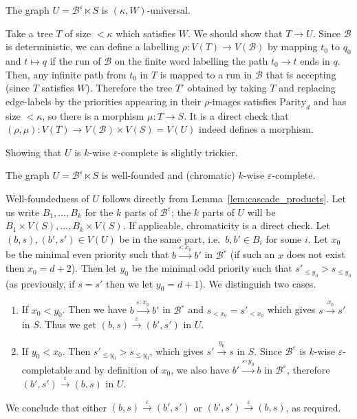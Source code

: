 \documentclass[a4paper,UKenglish,cleveref, thm-restate]{lipics-v2021}
\newcommand{\re}[1]{\xrightarrow{#1}}
\newcommand{\Parity}{\mathrm{Parity}}
\newcommand{\eps}{\varepsilon}
\newcommand{\casc}{\ltimes}
\newcommand{\B}{\mathcal B}
\begin{document}
\begin{claim}
    The graph $U = \B^\eps \casc S$ is $(\kappa,W)$-universal.
\end{claim}

\begin{claimproof}
    Take a tree $T$ of size $<\kappa$ which satisfies $W$.
    We should show that $T \to U$.
    Since $\B$ is deterministic, we can define a labelling $\rho\colon V(T) \to V(\B)$ by mapping $t_0$ to $q_0$ and $t \mapsto q$ if the run of $\B$ on the finite word labelling the path $t_0\re{}t$ ends in $q$. Then, any infinite path from $t_0$ in $T$ is mapped to a run in $\B$ that is accepting (since $T$ satisfies $W$).
    Therefore the tree $T'$ obtained by taking $T$ and replacing edge-labels by the priorities appearing in their $\rho$-images satisfies $\Parity_d$ and has size $<\kappa$, so there is a morphism $\mu:T \to S$.
    It is a direct check that $(\rho,\mu) \colon V(T) \to V(\B) \times V(S) = V(U)$ indeed defines a morphism.
\end{claimproof}

Showing that $U$ is $k$-wise $\eps$-complete is slightly trickier.

\begin{claim}
    The graph $U = \B^\eps \casc S$ is well-founded and (chromatic) $k$-wise $\eps$-complete.
\end{claim}

\begin{claimproof}
    Well-foundedness of $U$ follows directly from Lemma~\ref{lem:cascade_products}.
    Let us write $B_1,\dots,B_k$ for the $k$ parts of $\B^\eps$; the $k$ parts of $U$ will be $B_1 \times V(S),\dots, B_k \times V(S)$.
    If applicable, chromaticity is a direct check.
    Let $(b,s),(b',s') \in V(U)$ be in the same part, i.e.~$b,b' \in B_i$ for some $i$.
    Let $x_0$ be the minimal even priority such that 
    $b \re{\eps:x_0} b'$ in $\B^\eps$ 
    (if such an $x$ does not exist then $x_0=d+2$).
    Then let $y_0$ be the minimal odd priority such that $s'_{\leq y_0} > s_{\leq y_0}$ (as previously, if $s=s'$ then we let $y_0=d+1$).
    We distinguish two cases.
    \begin{enumerate}[(1)]
        \item If $x_0 < y_0$. Then we have $b \re{\eps:x_0} b'$ in $\B^\eps$ and $s_{<x_0} = s'_{<x_0}$ which gives $s \re{x_0} s'$ in $S$.
        Thus we get $(b,s) \re{\eps} (b',s')$ in $U$.
        \item If $y_0 < x_0$. Then $s'_{\leq y_0} > s_{\leq y_0}$, which gives $s' \re{y_0} s$ in $S$.
        Since $\B^\eps$ is $k$-wise $\eps$-completable and by definition of $x_0$, we also have $b' \re{\eps:y_0} b$ in $\B^\eps$, therefore $(b',s') \re{\eps} (b,s)$ in $U$.
    \end{enumerate}

    We conclude that either $(b,s)\re{\eps}(b',s')$ or $(b',s') \re{\eps} (b,s)$, as required.
\end{claimproof}
 
\end{document}
